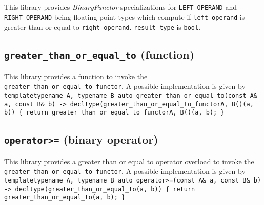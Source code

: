 \documentclass[oneside]{book}
\begin{document}
\noindent{}This library provides \textit{BinaryFunctor}         specializations for
\texttt{LEFT\_OPERAND} and   \texttt{RIGHT\_OPERAND} being     floating point types
which compute if \texttt{left\_operand}                 is greater than or equal to
\texttt{right\_operand}. \texttt{result\_type} is \texttt{bool}.

\subsection{\texttt{greater\_than\_or\_equal\_to} (function)}
This library provides a function to invoke the \texttt{greater\_than\_or\_equal\_to\_functor}.
A possible implementation is given by\newline
\texttt{
template\textlangle typename A, typename B\textrangle\newline
auto greater\_than\_or\_equal\_to(const A\& a, const B\& b)\newline
-> decltype(greater\_than\_or\_equal\_to\_functor\textlangle A, B\textrangle()(a, b))\newline
\{ return greater\_than\_or\_equal\_to\_functor\textlangle A, B\textrangle()(a, b); \}
}

\subsection{\texttt{operator>=} (binary operator)}
This library provides a greater than or equal to operator overload to invoke the \texttt{greater\_than\_or\_equal\_to\_functor}.
A possible implementation is given by\newline
\texttt{
template\textlangle typename A, typename B\textrangle\newline
auto operator>=(const A\& a, const B\& b)\newline
-> decltype(greater\_than\_or\_equal\_to(a, b))\newline
\{ return greater\_than\_or\_equal\_to(a, b); \}
}
\end{document}

